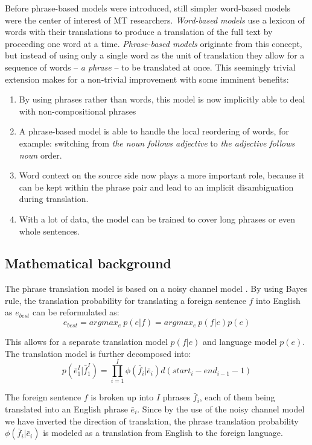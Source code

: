 Before phrase-based models were introduced, still simpler word-based models were
the center of interest of MT researchers.
\emph{Word-based models} use a lexicon of words with their translations to produce
a translation of the full text by proceeding one word at a time.
\emph{Phrase-based models} originate from this concept, but instead of using only
a single word as the unit of translation they allow for a sequence of words -- \emph{a phrase}
-- to be translated at once.
This seemingly trivial extension makes for a non-trivial improvement with some
imminent benefits:
\begin{enumerate}
  \item By using phrases rather than words, this model is now implicitly able to deal
    with non-compositional phrases
  \item A phrase-based model is able to handle the local reordering of words, for example:
    switching from \emph{the noun follows adjective} to \emph{the adjective follows noun} order.
  \item Word context on the source side now plays a more important role, because it can be kept
    within the phrase pair and lead to an implicit disambiguation during translation.
  \item With a lot of data, the model can be trained to cover long phrases or even
    whole sentences.
\end{enumerate}

\subsection{Mathematical background}

The phrase translation model is based on a noisy channel model \citep{koehn:spbt}.
By using Bayes rule, the translation probability for translating a foreign sentence $f$
into English as $e_{best}$ can be reformulated as:
\begin{equation}
  e_{best} = argmax_{e}~p(e|f) =  argmax_{e}~p(f|e)p(e)
\end{equation}

This allows for a separate translation model $p(f|e)$ and language model $p(e)$.
The translation model is further decomposed into:
\begin{equation} \label{eq:tm}
  p(\bar{e}_1^I|\bar{f}_1^I) = \prod_{i=1}^I \phi(\bar{f}_i|\bar{e}_i) d(start_i - end_{i-1} - 1)
\end{equation}

The foreign sentence $f$ is broken up into $I$ phrases $\bar{f}_i$, each of them
being translated into an English phrase $\bar{e}_i$. Since by the use of the noisy channel
model we have inverted the direction of translation, the phrase translation probability
$\phi(\bar{f}_i|\bar{e}_i)$ is modeled as a translation from English to the foreign language.

